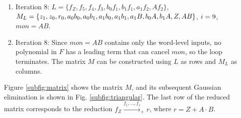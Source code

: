 \begin{Example}
\begin{enumerate}
\item Iteration 8: $L = \{f_Z, f_5, f_4, f_3, b_0f_1, b_1f_1, a_1f_2,
  Af_2\}$,
  $\\M_L = \{z_1, z_0, r_0, a_0b_0, a_0b_1, a_1b_0, a_1b_1, a_1B, b_0A, b_1A, Z, AB\}$, 
  $\\i = 9$, $mon = AB$. 

\item Iteration 8: Since $mon = AB$ contains only the
  word-level inputs, no polynomial in $F$ has a leading term that can
  cancel $mon$, so the loop terminates. The matrix $M$ can be
  constructed using $L$ as rows and $M_L$ as columns.

\end{enumerate}

Figure \ref{subfig:matrix} shows the matrix $M$, and its subsequent
Gaussian elimination is shown in Fig. \ref{subfig:triangular}. The
last row of the reduced matrix corresponds to the reduction
$f_Z \xrightarrow{f_1, \dots, f_s}_+r$, 
where $r = Z+A\cdot B$.
\end{Example}


